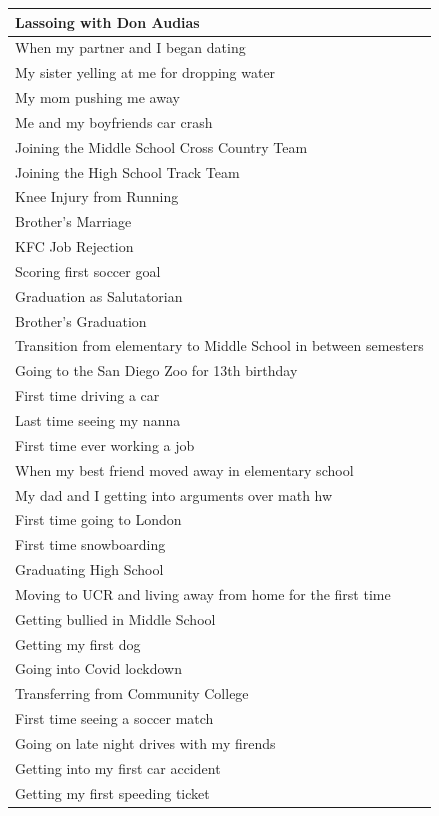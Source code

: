 \documentclass[
  .7em,
  letterpaper,
  DIV=11,
  numbers=noendperiod]{scrartcl}
\begin{document}
\begin{table}
\begin{tabular}{l}
\hline
Lassoing with Don Audias\\
\hline
When my partner and I began dating\\
\hline
My sister yelling at me for dropping water\\
\hline
My mom pushing me away\\
\hline
Me and my boyfriends car crash\\
\hline
Joining the Middle School Cross Country Team\\
\hline
Joining the High School Track Team\\
\hline
Knee Injury from Running\\
\hline
Brother's Marriage\\
\hline
KFC Job Rejection\\
\hline
Scoring first soccer goal\\
\hline
Graduation as Salutatorian\\
\hline
Brother's Graduation\\
\hline
Transition from elementary to Middle School in between semesters\\
\hline
Going to the San Diego Zoo for 13th birthday\\
\hline
First time driving a car\\
\hline
Last time seeing my nanna\\
\hline
First time ever working a job\\
\hline
When my best friend moved away in elementary school\\
\hline
My dad and I getting into arguments over math hw\\
\hline
First time going to London\\
\hline
First time snowboarding\\
\hline
Graduating High School\\
\hline
Moving to UCR and living away from home for the first time\\
\hline
Getting bullied in Middle School\\
\hline
Getting my first dog\\
\hline
Going into Covid lockdown\\
\hline
Transferring from Community College\\
\hline
First time seeing a soccer match\\
\hline
Going on late night drives with my firends\\
\hline
Getting into my first car accident\\
\hline
Getting my first speeding ticket\\

\end{tabular}
\end{table}
\end{document}
